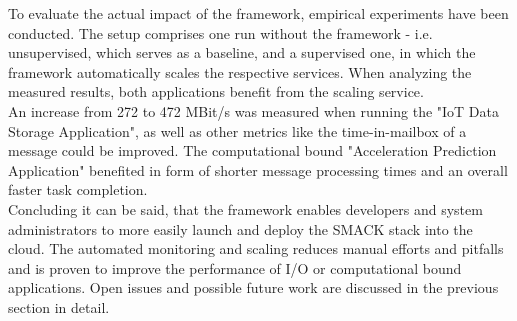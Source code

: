 To evaluate the actual impact of the framework, empirical experiments have been conducted.
The setup comprises one run without the framework - i.e. unsupervised, which serves as a baseline, and a supervised one, in which the framework automatically scales the respective services.
When analyzing the measured results, both applications benefit from the scaling service.\\
An increase from 272 to 472 MBit/s was measured when running the "IoT Data Storage Application", as well as other metrics like the time-in-mailbox of a message could be improved.
The computational bound "Acceleration Prediction Application" benefited in form of shorter message processing times and an overall faster task completion.\\

Concluding it can be said, that the framework enables developers and system administrators to more easily launch and deploy the SMACK stack into the cloud.
The automated monitoring and scaling reduces manual efforts and pitfalls and is proven to improve the performance of I/O or computational bound applications.
Open issues and possible future work are discussed in the previous section in detail.

